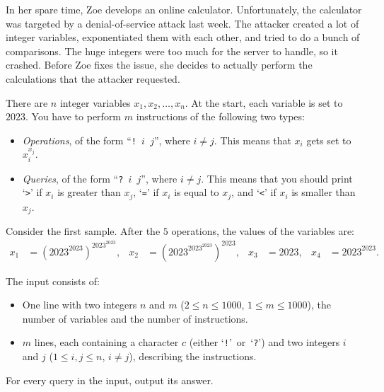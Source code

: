 
%
%
\newcommand{\maxn}{1000}%
\newcommand{\maxm}{1000}%
%
In her spare time, Zoe develops an online calculator.
Unfortunately, the calculator was targeted by a denial-of-service attack last week.
The attacker created a lot of integer variables, exponentiated them with each other,
and tried to do a bunch of comparisons. The huge integers were too much for the server to handle, so it
crashed. Before Zoe fixes the issue, she decides to actually perform the calculations that the attacker
requested.


There are $n$ integer variables $x_1, x_2, \dots, x_n$. At the start, each variable is set to $2023$.
You have to perform $m$ instructions of the following two types:
\begin{itemize}
\item \textit{Operations}, of the form ``\texttt{!~$i$~$j$}'', where $i \neq j$.
    This means that $x_i$ gets set to $x_i^{x_j}$.
\item \textit{Queries}, of the form ``\texttt{?~$i$~$j$}'', where $i \neq j$.
    This means that you should print `\verb|>|' if $x_i$ is greater than $x_j$, `\verb|=|' if $x_i$ is equal to
    $x_j$, and `\verb|<|' if $x_i$ is smaller than $x_j$.
\end{itemize}

Consider the first sample. After the $5$ operations, the values of the variables are:
\newcommand{\x}{{2023}}
\begin{align*}
x_1&=\left(\x^\x\right)^{\x^\x},&
x_2&=\left(\x^{\x^\x}\right)^\x,&
x_3&=\x,&
x_4&=\x^\x.
\end{align*}

%

\begin{Input}
    The input consists of:
    \begin{itemize}
        \item One line with two integers $n$ and $m$ ($2 \leq n \leq \maxn$, $1 \leq m \leq \maxm$),
            the number of variables and the number of instructions.
        \item $m$ lines, each containing a character $c$ (either `\texttt{!}'~or~`\texttt{?}')
            and two integers $i$ and $j$ ($1 \leq i, j \leq n$, $i \neq j$), describing the instructions.
    \end{itemize}
\end{Input}

\begin{Output}
    For every query in the input, output its answer.
\end{Output}
